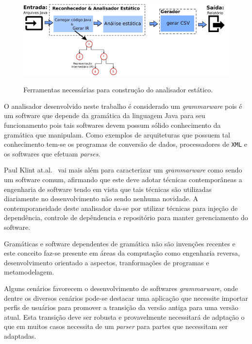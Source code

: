 \begin{figure}[h]
	\center
	\includegraphics[scale=0.9]{Imagens/stagesAnalizer}
	\label{fig:stagesAnalyzer}
	\caption{Ferramentas necess\'{a}rias para constru\c{c}\~{a}o do analisador est\'{a}tico.}
\end{figure}

O analisador desenvolvido neste trabalho \'{e} considerado um {\it grammarware} pois \'{e} um software que depende da gram\'{a}tica da linguagem Java para seu funcionamento pois tais softwares devem possum s\'{o}lido conhecimento da  gram\'{a}tica que manipulam. Como exemplos de arquiteturas que possuem tal conhecimento tem-se os programas de convers\~{a}o de dados, processadores de \texttt{XML} e os softwares que efetuam \textit{parses}.

Paul Klint at.al.~\cite{klint2005toward} vai mais al\'{e}m para caracterizar um {\it grammarware} como sendo um software comum, afirmando que este deve  adotar t\'{e}cnicas contempor\^{a}neas a engenharia de software tendo em vista que tais t\'{e}cnicas s\~{a}o utilizadas diariamente no desenvolvimento n\~{a}o sendo nenhuma novidade. A contemporaneidade deste analisador da-se por utilizar t\'{e}cnicas para inje\c{c}\~{a}o de depend\^{e}ncia, controle de dep\^{e}ndencia e  reposit\'{o}rio para manter gerenciamento do software.

Gram\'{a}ticas e software dependentes de gram\'{a}tica n\~{a}o s\~{a}o inven\c{c}\~{o}es recentes e este conceito faz-se presente em \'{a}reas da computa\c{c}\~{a}o como engenharia reversa, desenvolvimento orientado a aspectos, tranforma\c{c}\~{o}es de programas e metamodelagem.

Alguns cen\'{a}rios favorecem o desenvolvimento de softwares {\it grammarware}, onde dentre os diversos cen\'{a}rios pode-se destacar uma aplica\c{c}\~{a}o que necessite importar perfis de usu\'{a}rios para promover a transi\c{c}\~{a}o da vers\~{a}o antiga para uma vers\~{a}o atual. Esta transi\c{c}\~{a}o deve ser robusta e provavelmente necessitar\'{a} de adpta\c{c}\~{a}o o que em muitos casos necessita de um \textit{parser} para partes que necessitam ser adaptadas.

